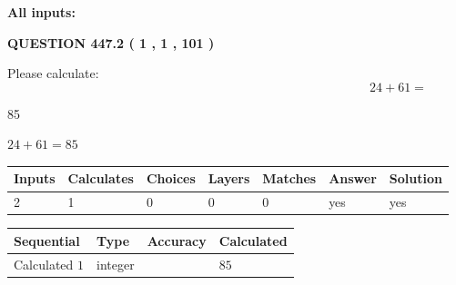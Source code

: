 \documentclass[12pt]{article}
\begin{document}
   
   
   
\noindent\vspace{0.1in}\hspace{-0.08in} {\textbf{\Large{All inputs: }}}
   
   
  
\vspace{0.2in}
  
{\textbf{\Large{QUESTION
447.2 
 ( 1 , 1 , 101 )
}}}
  
  
 
Please calculate:
\begin{equation}
24 +  %
61 = \nonumber
\end{equation}
 
 
 
\noindent{}
 
 

85
 
 
\noindent{}
 
 

 
 
 
\noindent{}
 
 

$ %
24 +  %
61=   %
85$
 
 
\noindent{}
 
 

 
   
   
   
   
\noindent\begin{tabular}{|l|l|l|l|l|l|l|}
 \hline
Inputs & Calculates & Choices & Layers & Matches & Answer & Solution \\ \hline
 2  & 
 1  & 
 0
  & 
 0  & 
 0  & 
  yes & 
  yes 
  \\ \hline
 \end{tabular}
   
   
   
   
\noindent{}
   
   
  
  
\noindent\begin{tabular}{|l|l|l|l|}
\hline
 Sequential & Type & Accuracy & Calculated \\ 
\hline
 
 
  Calculated $  1 $ & integer &  & 
  $ 85 $ 
 \\  \hline  
 \end{tabular}
   
\end{document}
